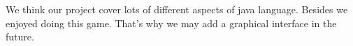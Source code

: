 We think our project cover lots of different aspects of java language.
Besides we enjoyed doing this game. That's why we may add a graphical interface in the future.